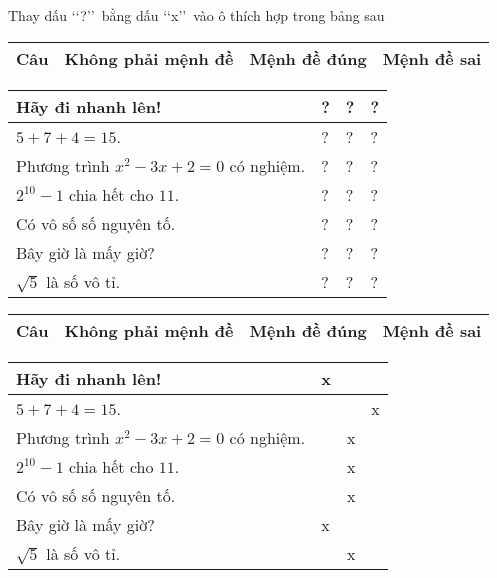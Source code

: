 \begin{bt}%
	Thay dấu \lq\lq ?\rq\rq\ bằng dấu \lq\lq  x\rq\rq\ vào ô thích hợp trong bảng sau
	\begin{center}
		\begin{tabular}{|>{\centering\arraybackslash}m{5.5cm}|>{\centering\arraybackslash}m{2cm}|>{\centering\arraybackslash}m{2cm}|>{\centering\arraybackslash}m{2cm}|}
			\hline
			Câu & Không phải mệnh đề & Mệnh đề đúng & Mệnh đề sai \\
			\hline
		\end{tabular}
		\begin{tabular}{|>{\raggedright\arraybackslash}m{5.5cm}|>{\centering\arraybackslash}m{2cm}|>{\centering\arraybackslash}m{2cm}|>{\centering\arraybackslash}m{2cm}|}
			Hãy đi nhanh lên! & ? & ? & ? \\
			\hline
			$5+7+4=15$. & ? & ? & ? \\
			\hline
			Phương trình $x^2-3x+2=0$ có nghiệm. & ? & ? & ? \\
			\hline
			$2^{10}-1$ chia hết cho $11$. & ? & ? & ? \\
			\hline
			Có vô số số nguyên tố. & ? & ? & ? \\
			\hline
			Bây giờ là mấy giờ? & ? & ? & ? \\
			\hline
			$\sqrt{5}$ là số vô tỉ. & ? & ? & ? \\
			\hline
		\end{tabular}
	\end{center}
	\loigiai
	{
		\begin{center}
			\begin{tabular}{|>{\centering\arraybackslash}m{5.5cm}|>{\centering\arraybackslash}m{2cm}|>{\centering\arraybackslash}m{2cm}|>{\centering\arraybackslash}m{2cm}|}
				\hline
				Câu & Không phải mệnh đề & Mệnh đề đúng & Mệnh đề sai \\
				\hline
			\end{tabular}
			\begin{tabular}{|>{\raggedright\arraybackslash}m{5.5cm}|>{\centering\arraybackslash}m{2cm}|>{\centering\arraybackslash}m{2cm}|>{\centering\arraybackslash}m{2cm}|}
				Hãy đi nhanh lên! & x &  &  \\
				\hline
				$5+7+4=15$. &  &  & x \\
				\hline
				Phương trình $x^2-3x+2=0$ có nghiệm. &  & x &  \\
				\hline
				$2^{10}-1$ chia hết cho $11$. &  & x &  \\
				\hline
				Có vô số số nguyên tố. &  & x &  \\
				\hline
				Bây giờ là mấy giờ? & x &  &  \\
				\hline
				$\sqrt{5}$ là số vô tỉ. &  & x &  \\
				\hline
			\end{tabular}
		\end{center}
	}
\end{bt}

